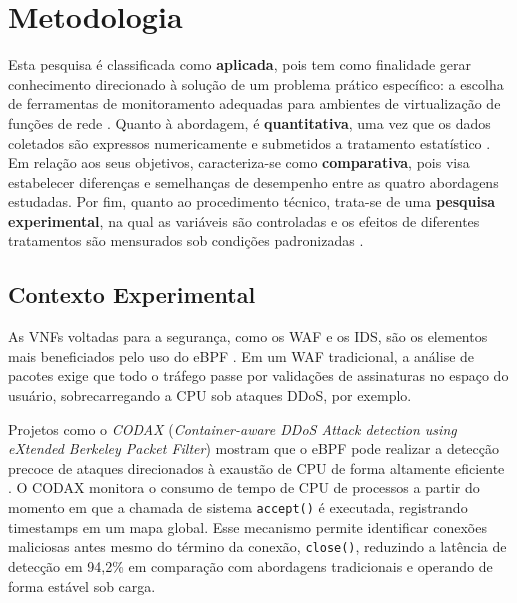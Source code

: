 
\chapter{Metodologia}
\label{chap:metodologia}

Esta pesquisa é classificada como \textbf{aplicada}, pois tem como finalidade gerar conhecimento direcionado à solução de um problema prático específico: a escolha de ferramentas de monitoramento adequadas para ambientes de virtualização de funções de rede \cite{gil2021}. Quanto à abordagem, é \textbf{quantitativa}, uma vez que os dados coletados são expressos numericamente e submetidos a tratamento estatístico \cite{marconi2017}. Em relação aos seus objetivos, caracteriza-se como \textbf{comparativa}, pois visa estabelecer diferenças e semelhanças de desempenho entre as quatro abordagens estudadas. Por fim, quanto ao procedimento técnico, trata-se de uma \textbf{pesquisa experimental}, na qual as variáveis são controladas e os efeitos de diferentes tratamentos são mensurados sob condições padronizadas \cite{gil2021}.




\section{Contexto Experimental}

As VNFs voltadas para a segurança, como os WAF e os IDS, são os elementos mais beneficiados pelo uso do eBPF \cite{technologies12080122}. Em um WAF tradicional, a análise de pacotes exige que todo o tráfego passe por validações de assinaturas no espaço do usuário, sobrecarregando a CPU sob ataques DDoS, por exemplo.

Projetos como o \textit{CODAX} (\textit{Container-aware DDoS Attack detection using eXtended Berkeley Packet Filter}) mostram que o eBPF pode realizar a detecção precoce de ataques direcionados à exaustão de CPU de forma altamente eficiente \cite{codax2025remya}. O CODAX monitora o consumo de tempo de CPU de processos a partir do momento em que a chamada de sistema \texttt{accept()} é executada, registrando timestamps em um mapa global. Esse mecanismo permite identificar conexões maliciosas antes mesmo do término da conexão, \texttt{close()}, reduzindo a latência de detecção em 94,2\% em comparação com abordagens tradicionais e operando de forma estável sob carga.

